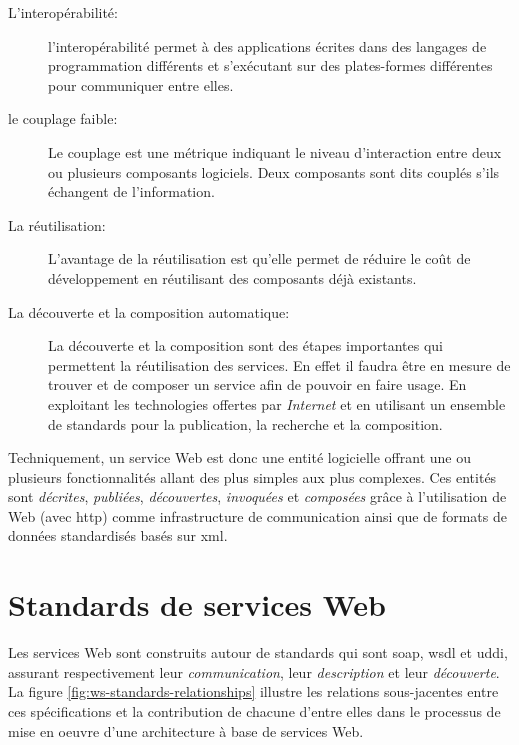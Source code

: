   \renewcommand{\descriptionlabel}[1]{\hspace{0.5cm}\textbullet~\textsf{#1}}
  \begin{description}
  \item [L'interopérabilité:] l'interopérabilité permet à des
    applications écrites dans des langages de programmation différents
    et s'exécutant sur des plates-formes différentes pour communiquer
    entre elles.

  \item [le couplage faible:] Le couplage est une métrique indiquant
    le niveau d'interaction entre deux ou plusieurs composants
    logiciels. Deux composants sont dits couplés s'ils échangent de
    l'information.

  \item [La réutilisation:] L'avantage de la réutilisation est qu'elle
    permet de réduire le coût de développement en réutilisant
    des composants déjà existants.

  \item [La découverte et la composition automatique:] La découverte
    et la composition sont des étapes importantes qui permettent la
    réutilisation des services. En effet il faudra être en mesure de
    trouver et de composer un service afin de pouvoir en faire
    usage. En exploitant les technologies offertes par
    \textit{Internet} et en utilisant un ensemble de standards pour la
    publication, la recherche et la composition.
  \end{description}
  \enddescription

  Techniquement, un service Web est donc une entité logicielle offrant
  une ou plusieurs fonctionnalités allant des plus simples aux plus
  complexes. Ces entités sont \emph{décrites}, \emph{publiées},
  \emph{découvertes}, \emph{invoquées} et \emph{composées} grâce à
  l'utilisation de Web (avec \acrshort{http}) comme infrastructure de
  communication ainsi que de formats de données standardisés basés sur
  \acrshort{xml}.

\section{Standards de services Web}
\label{sec:ws-standards}
Les services Web sont construits autour de standards qui sont
\acrshort{soap}, \acrshort{wsdl} et \acrshort{uddi}, assurant
respectivement leur \emph{communication}, leur \emph{description} et
leur \emph{découverte}. La figure \ref{fig:ws-standards-relationships}
illustre les relations sous-jacentes entre ces spécifications et la
contribution de chacune d'entre elles dans le processus de mise en oeuvre
d'une architecture à base de services Web.\bigskip

